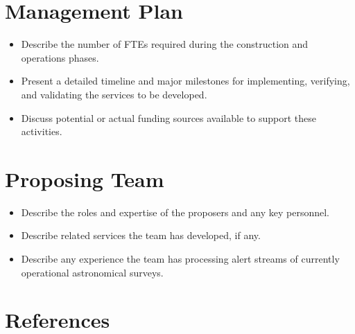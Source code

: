 \documentclass[11pt, letterpaper]{article}
\begin{document}
\section{Management Plan}

\begin{itemize}
\item Describe the number of FTEs required during the construction and operations phases.
\item Present a detailed timeline and major milestones for implementing, verifying, and validating the services to be developed.
\item Discuss potential or actual funding sources available to support these activities.	
\end{itemize}


\section{Proposing Team}

\begin{itemize}
\item Describe the roles and expertise of the proposers and any key personnel.
\item Describe related services the team has developed, if any.
\item Describe any experience the team has processing alert streams of currently operational astronomical surveys. 
\end{itemize}

\section{References}
\end{document}
